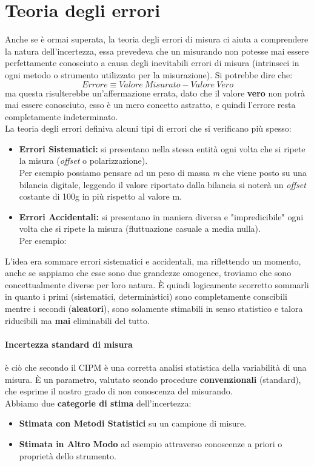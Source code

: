 \documentclass[a4paper,11pt]{report}
\begin{document}
\section{Teoria degli errori}
Anche se è ormai superata, la teoria degli errori di misura ci aiuta a comprendere la natura dell'incertezza, essa prevedeva che un misurando non potesse mai essere perfettamente conosciuto a causa degli inevitabili errori di misura (intrinseci in ogni metodo o strumento utilizzato per la misurazione). Si potrebbe dire che: $$Errore \equiv  Valore\ Misurato - Valore\ Vero$$
ma questa risulterebbe un'affermazione errata, dato che il valore \textbf{vero} non potrà mai essere conosciuto, esso è un mero concetto astratto, e quindi l'errore resta completamente indeterminato.\\
La teoria degli errori definiva alcuni tipi di errori che si verificano più spesso:
\begin{itemize}
  \item \textbf{Errori Sistematici:} si presentano nella stessa entità ogni volta che si ripete la misura (\textit{offset} o polarizzazione).\\
  Per esempio possiamo pensare ad un peso di massa \textit{m} che viene posto su una bilancia digitale, leggendo il valore riportato dalla bilancia si noterà un \textit{offset} costante di 100g in più rispetto al valore m.
  \item \textbf{Errori Accidentali:} si presentano in maniera diversa e "impredicibile" ogni volta che si ripete la misura (fluttuazione casuale a media nulla).\\
  Per esempio:
\end{itemize}
L'idea era sommare errori sistematici e accidentali, ma riflettendo un momento, anche se sappiamo che esse sono due grandezze omogenee, troviamo che sono concettualmente diverse per loro natura. È quindi logicamente scorretto sommarli in quanto i primi (sistematici, deterministici) sono completamente conscibili mentre i secondi (\textbf{aleatori}), sono solamente stimabili in senso statistico e talora riducibili ma \textbf{mai} eliminabili del tutto.
\paragraph*{Incertezza standard di misura} è ciò che secondo il CIPM è una corretta analisi statistica della variabilità di una misura. È un parametro, valutato seondo procedure \textbf{convenzionali} (standard), che esprime il nostro grado di non conoscenza del misurando.\\
Abbiamo due \textbf{categorie di stima} dell'incertezza:
\begin{itemize}
  \item \textbf{Stimata con Metodi Statistici} su un campione di misure.
  \item \textbf{Stimata in Altro Modo} ad esempio attraverso conoscenze a priori o proprietà dello strumento.
\end{itemize}
\end{document}
